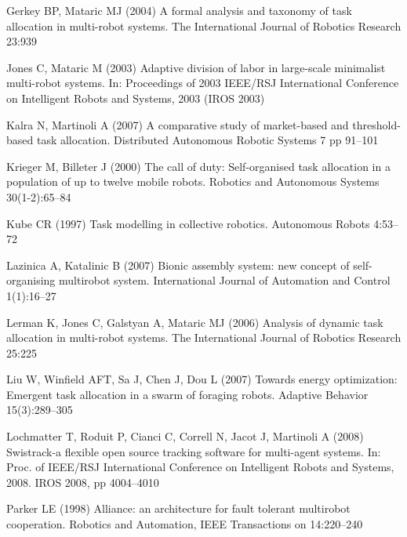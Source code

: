\documentclass[smallcondensed]{svjour3}
\begin{document}
\begin{thebibliography}{22}
Gerkey BP, Mataric MJ (2004) A formal analysis and taxonomy of task allocation
  in multi-robot systems. The International Journal of Robotics Research 23:939

Jones C, Mataric M (2003) {Adaptive division of labor in large-scale minimalist
  multi-robot systems}. In: Proceedings of 2003 IEEE/RSJ International
  Conference on Intelligent Robots and Systems, 2003 (IROS 2003)

Kalra N, Martinoli A (2007) A comparative study of market-based and
  threshold-based task allocation. Distributed Autonomous Robotic Systems 7 pp
  91--101

Krieger M, Billeter J (2000) The call of duty: Self-organised task allocation
  in a population of up to twelve mobile robots. Robotics and Autonomous
  Systems 30(1-2):65--84

Kube CR (1997) Task modelling in collective robotics. Autonomous Robots
  4:53--72

Lazinica A, Katalinic B (2007) Bionic assembly system: new concept of
  self-organising multirobot system. International Journal of Automation and
  Control 1(1):16--27

Lerman K, Jones C, Galstyan A, Mataric MJ (2006) Analysis of dynamic task
  allocation in multi-robot systems. The International Journal of Robotics
  Research 25:225

Liu W, Winfield AFT, Sa J, Chen J, Dou L (2007) Towards energy optimization:
  Emergent task allocation in a swarm of foraging robots. Adaptive Behavior
  15(3):289--305

Lochmatter T, Roduit P, Cianci C, Correll N, Jacot J, Martinoli A (2008)
  Swistrack-a flexible open source tracking software for multi-agent systems.
  In: Proc. of IEEE/RSJ International Conference on Intelligent Robots and
  Systems, 2008. IROS 2008, pp 4004--4010

Parker LE (1998) Alliance: an architecture for fault tolerant multirobot
  cooperation. Robotics and Automation, IEEE Transactions on 14:220--240


\end{thebibliography}
\end{document}

